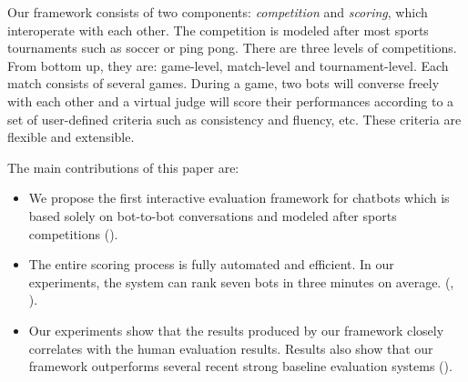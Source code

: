 Our framework consists of two components: \textit{competition} and 
\textit{scoring}, which interoperate with each other. 
The competition is modeled
after most sports tournaments such as soccer or ping pong. 
There are three levels of competitions. From bottom up, they are:
game-level, match-level and tournament-level. 
Each match consists of several games. During a game, two bots will converse 
freely with each other and a virtual judge will score their performances 
according to a set of user-defined criteria such as consistency and fluency, 
etc.  These criteria are flexible and extensible.


The main contributions of this paper are:
\begin{itemize}
\item We propose the first interactive evaluation framework for chatbots which
is based solely on bot-to-bot conversations and modeled after sports competitions ().
\item  The entire scoring process is fully automated and efficient. 
In our experiments, the system can rank seven bots in three minutes on average.
(, ).
\item  Our experiments show that the results produced by our framework
closely correlates with the human evaluation results. 
Results also show that our framework outperforms 
several recent strong baseline evaluation systems ().
\end{itemize}
